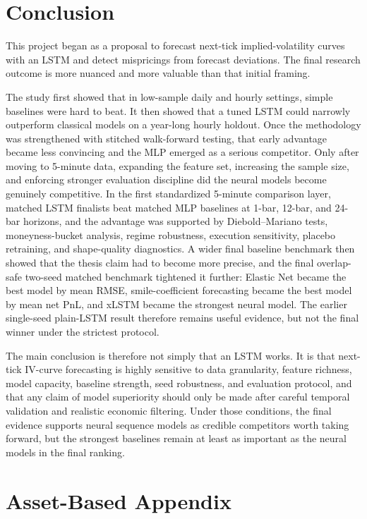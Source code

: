 \documentclass[12pt]{report}
\begin{document}
\chapter{Conclusion}
This project began as a proposal to forecast next-tick implied-volatility curves with an LSTM and detect mispricings from forecast deviations. The final research outcome is more nuanced and more valuable than that initial framing.

The study first showed that in low-sample daily and hourly settings, simple baselines were hard to beat. It then showed that a tuned LSTM could narrowly outperform classical models on a year-long hourly holdout. Once the methodology was strengthened with stitched walk-forward testing, that early advantage became less convincing and the MLP emerged as a serious competitor. Only after moving to 5-minute data, expanding the feature set, increasing the sample size, and enforcing stronger evaluation discipline did the neural models become genuinely competitive. In the first standardized 5-minute comparison layer, matched LSTM finalists beat matched MLP baselines at 1-bar, 12-bar, and 24-bar horizons, and the advantage was supported by Diebold--Mariano tests, moneyness-bucket analysis, regime robustness, execution sensitivity, placebo retraining, and shape-quality diagnostics. A wider final baseline benchmark then showed that the thesis claim had to become more precise, and the final overlap-safe two-seed matched benchmark tightened it further: Elastic Net became the best model by mean RMSE, smile-coefficient forecasting became the best model by mean net PnL, and xLSTM became the strongest neural model. The earlier single-seed plain-LSTM result therefore remains useful evidence, but not the final winner under the strictest protocol.

The main conclusion is therefore not simply that an LSTM works. It is that next-tick IV-curve forecasting is highly sensitive to data granularity, feature richness, model capacity, baseline strength, seed robustness, and evaluation protocol, and that any claim of model superiority should only be made after careful temporal validation and realistic economic filtering. Under those conditions, the final evidence supports neural sequence models as credible competitors worth taking forward, but the strongest baselines remain at least as important as the neural models in the final ranking.

\appendix

\chapter{Asset-Based Appendix}
\end{document}
